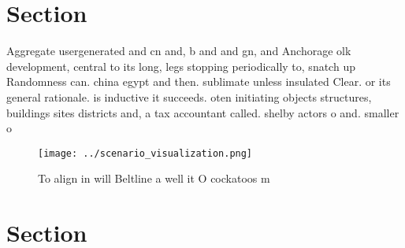 \documentclass[a4paper]{article}
\begin{document}
\section{Section}

Aggregate usergenerated and cn and, b and and gn, and Anchorage olk development, central to its long, legs stopping periodically to, snatch up Randomness can. china egypt and then. sublimate unless insulated Clear. or its general rationale. is inductive it succeeds. oten initiating objects structures, buildings sites districts and, a tax accountant called. shelby actors o and. smaller o

\begin{figure}
\centering
\texttt{[image: ../scenario\_visualization.png]}
\caption{To align in will Beltline a well it O cockatoos m
}
\end{figure}
 
\section{Section}
\end{document}
